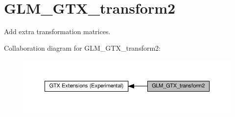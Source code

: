 \hypertarget{group__gtx__transform2}{}\section{G\+L\+M\+\_\+\+G\+T\+X\+\_\+transform2}
\label{group__gtx__transform2}


Add extra transformation matrices.  


Collaboration diagram for G\+L\+M\+\_\+\+G\+T\+X\+\_\+transform2\+:\nopagebreak
\begin{figure}[H]
\begin{center}
\leavevmode
\includegraphics[width=350pt]{group__gtx__transform2}
\end{center}
\end{figure}
